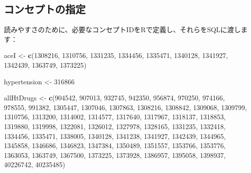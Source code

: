\documentclass[
  11pt]{book}
\newenvironment{Shaded}{\begin{snugshade}}{\end{snugshade}}
\newcommand{\DecValTok}[1]{\textcolor[rgb]{0.00,0.00,0.81}{#1}}
\newcommand{\FunctionTok}[1]{\textcolor[rgb]{0.13,0.29,0.53}{\textbf{#1}}}
\newcommand{\NormalTok}[1]{#1}
\newcommand{\OtherTok}[1]{\textcolor[rgb]{0.56,0.35,0.01}{#1}}
\theoremstyle{definition}
\theoremstyle{definition}
\theoremstyle{definition}
\theoremstyle{definition}
\theoremstyle{remark}
\begin{document}
\subsection{コンセプトの指定}\label{ux30b3ux30f3ux30bbux30d7ux30c8ux306eux6307ux5b9a}

読みやすさのために、必要なコンセプトIDをRで定義し、それらをSQLに渡します：

\begin{Shaded}
\begin{Highlighting}[]
\NormalTok{aceI }\OtherTok{\textless{}{-}} \FunctionTok{c}\NormalTok{(}\DecValTok{1308216}\NormalTok{, }\DecValTok{1310756}\NormalTok{, }\DecValTok{1331235}\NormalTok{, }\DecValTok{1334456}\NormalTok{, }\DecValTok{1335471}\NormalTok{, }\DecValTok{1340128}\NormalTok{, }\DecValTok{1341927}\NormalTok{,}
          \DecValTok{1342439}\NormalTok{, }\DecValTok{1363749}\NormalTok{, }\DecValTok{1373225}\NormalTok{)}

\NormalTok{hypertension }\OtherTok{\textless{}{-}} \DecValTok{316866}

\NormalTok{allHtDrugs }\OtherTok{\textless{}{-}} \FunctionTok{c}\NormalTok{(}\DecValTok{904542}\NormalTok{, }\DecValTok{907013}\NormalTok{, }\DecValTok{932745}\NormalTok{, }\DecValTok{942350}\NormalTok{, }\DecValTok{956874}\NormalTok{, }\DecValTok{970250}\NormalTok{, }\DecValTok{974166}\NormalTok{,}
                  \DecValTok{978555}\NormalTok{, }\DecValTok{991382}\NormalTok{, }\DecValTok{1305447}\NormalTok{, }\DecValTok{1307046}\NormalTok{, }\DecValTok{1307863}\NormalTok{, }\DecValTok{1308216}\NormalTok{,}
                  \DecValTok{1308842}\NormalTok{, }\DecValTok{1309068}\NormalTok{, }\DecValTok{1309799}\NormalTok{, }\DecValTok{1310756}\NormalTok{, }\DecValTok{1313200}\NormalTok{, }\DecValTok{1314002}\NormalTok{,}
                  \DecValTok{1314577}\NormalTok{, }\DecValTok{1317640}\NormalTok{, }\DecValTok{1317967}\NormalTok{, }\DecValTok{1318137}\NormalTok{, }\DecValTok{1318853}\NormalTok{, }\DecValTok{1319880}\NormalTok{,}
                  \DecValTok{1319998}\NormalTok{, }\DecValTok{1322081}\NormalTok{, }\DecValTok{1326012}\NormalTok{, }\DecValTok{1327978}\NormalTok{, }\DecValTok{1328165}\NormalTok{, }\DecValTok{1331235}\NormalTok{,}
                  \DecValTok{1332418}\NormalTok{, }\DecValTok{1334456}\NormalTok{, }\DecValTok{1335471}\NormalTok{, }\DecValTok{1338005}\NormalTok{, }\DecValTok{1340128}\NormalTok{, }\DecValTok{1341238}\NormalTok{,}
                  \DecValTok{1341927}\NormalTok{, }\DecValTok{1342439}\NormalTok{, }\DecValTok{1344965}\NormalTok{, }\DecValTok{1345858}\NormalTok{, }\DecValTok{1346686}\NormalTok{, }\DecValTok{1346823}\NormalTok{,}
                  \DecValTok{1347384}\NormalTok{, }\DecValTok{1350489}\NormalTok{, }\DecValTok{1351557}\NormalTok{, }\DecValTok{1353766}\NormalTok{, }\DecValTok{1353776}\NormalTok{, }\DecValTok{1363053}\NormalTok{,}
                  \DecValTok{1363749}\NormalTok{, }\DecValTok{1367500}\NormalTok{, }\DecValTok{1373225}\NormalTok{, }\DecValTok{1373928}\NormalTok{, }\DecValTok{1386957}\NormalTok{, }\DecValTok{1395058}\NormalTok{,}
                  \DecValTok{1398937}\NormalTok{, }\DecValTok{40226742}\NormalTok{, }\DecValTok{40235485}\NormalTok{)}
\end{Highlighting}
\end{Shaded}
\end{document}
